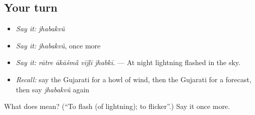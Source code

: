 \subsection*{Your turn}
\begin{itemize}
\raggedright
  \item \emph{Say it:} \emph{jhabakvũ}
  \item \emph{Say it:} \emph{jhabakvũ}, once more
  \item \emph{Say it:} \emph{rātre ākāśmā̃ vījḷī jhabkī.} — At night lightning flashed in the sky.
  \item \emph{Recall:} say the Gujarati for a howl of wind, then the Gujarati for a forecast, then say \emph{jhabakvũ} again
\end{itemize}

\begin{tcolorbox}[breakable,colback=teal!4,colframe=teal!35!black,title={Before you move on}]
What does  mean? (\textquotedblleft{}To flash (of lightning); to flicker\textquotedblright{}.) Say it once more.
\end{tcolorbox}
